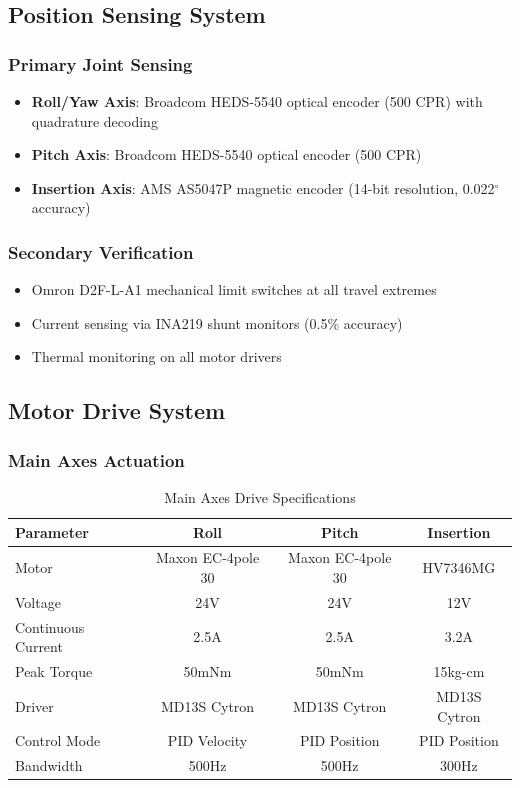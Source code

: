 \subsection{Position Sensing System}
\subsubsection{Primary Joint Sensing}
\begin{itemize}
    \item \textbf{Roll/Yaw Axis}: Broadcom HEDS-5540 optical encoder (500 CPR) with quadrature decoding
    \item \textbf{Pitch Axis}: Broadcom HEDS-5540 optical encoder (500 CPR)
    \item \textbf{Insertion Axis}: AMS AS5047P magnetic encoder (14-bit resolution, 0.022$^\circ$ accuracy)
\end{itemize}

\subsubsection{Secondary Verification}
\begin{itemize}
    \item Omron D2F-L-A1 mechanical limit switches at all travel extremes
    \item Current sensing via INA219 shunt monitors (0.5\% accuracy)
    \item Thermal monitoring on all motor drivers
\end{itemize}

\subsection{Motor Drive System}
\subsubsection{Main Axes Actuation}
\begin{table}[h]
\centering
\caption{Main Axes Drive Specifications}
\begin{tabular}{|l|c|c|c|}
\hline
\textbf{Parameter} & \textbf{Roll} & \textbf{Pitch} & \textbf{Insertion} \\ \hline
Motor & Maxon EC-4pole 30 & Maxon EC-4pole 30 & HV7346MG \\
Voltage & 24V & 24V & 12V \\
Continuous Current & 2.5A & 2.5A & 3.2A \\
Peak Torque & 50mNm & 50mNm & 15kg-cm \\
Driver & MD13S Cytron & MD13S Cytron & MD13S Cytron \\
Control Mode & PID Velocity & PID Position & PID Position \\
Bandwidth & 500Hz & 500Hz & 300Hz \\ \hline
\end{tabular}
\end{table}

